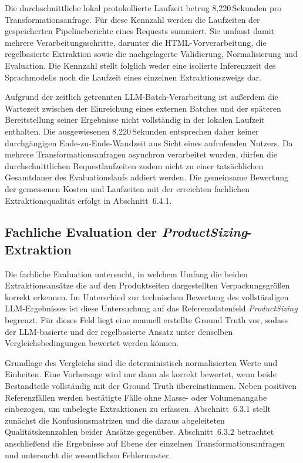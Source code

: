 Die durchschnittliche lokal protokollierte Laufzeit betrug 8,220\,Sekunden pro Transformationsanfrage. Für diese Kennzahl werden die Laufzeiten der gespeicherten Pipelineberichte eines Requests summiert. Sie umfasst damit mehrere Verarbeitungsschritte, darunter die HTML-Vorverarbeitung, die regelbasierte Extraktion sowie die nachgelagerte Validierung, Normalisierung und Evaluation. Die Kennzahl stellt folglich weder eine isolierte Inferenzzeit des Sprachmodells noch die Laufzeit eines einzelnen Extraktionszweigs dar.

Aufgrund der zeitlich getrennten LLM-Batch-Verarbeitung ist außerdem die Wartezeit zwischen der Einreichung eines externen Batches und der späteren Bereitstellung seiner Ergebnisse nicht vollständig in der lokalen Laufzeit enthalten. Die ausgewiesenen 8,220\,Sekunden entsprechen daher keiner durchgängigen Ende-zu-Ende-Wandzeit aus Sicht eines aufrufenden Nutzers. Da mehrere Transformationsanfragen asynchron verarbeitet wurden, dürfen die durchschnittlichen Requestlaufzeiten zudem nicht zu einer tatsächlichen Gesamtdauer des Evaluationslaufs addiert werden. Die gemeinsame Bewertung der gemessenen Kosten und Laufzeiten mit der erreichten fachlichen Extraktionsqualität erfolgt in Abschnitt~6.4.1.

\subsection{Fachliche Evaluation der \textit{ProductSizing}-Extraktion}

Die fachliche Evaluation untersucht, in welchem Umfang die beiden Extraktionsansätze die auf den Produktseiten dargestellten Verpackungsgrößen korrekt erkennen. Im Unterschied zur technischen Bewertung des vollständigen LLM-Ergebnisses ist diese Untersuchung auf das Referenzdatenfeld \textit{ProductSizing} begrenzt. Für dieses Feld liegt eine manuell erstellte Ground Truth vor, sodass der LLM-basierte und der regelbasierte Ansatz unter denselben Vergleichsbedingungen bewertet werden können.

Grundlage des Vergleichs sind die deterministisch normalisierten Werte und Einheiten. Eine Vorhersage wird nur dann als korrekt bewertet, wenn beide Bestandteile vollständig mit der Ground Truth übereinstimmen. Neben positiven Referenzfällen werden bestätigte Fälle ohne Masse- oder Volumenangabe einbezogen, um unbelegte Extraktionen zu erfassen. Abschnitt~6.3.1 stellt zunächst die Konfusionsmatrizen und die daraus abgeleiteten Qualitätskennzahlen beider Ansätze gegenüber. Abschnitt~6.3.2 betrachtet anschließend die Ergebnisse auf Ebene der einzelnen Transformationsanfragen und untersucht die wesentlichen Fehlermuster.

